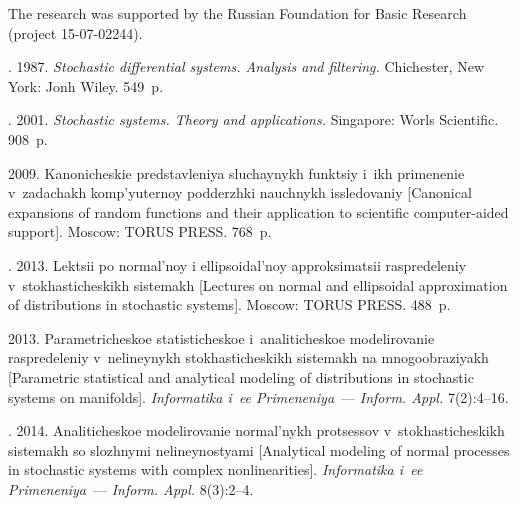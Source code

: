 
\vspace*{-9pt}

\Ack
\noindent
The research was supported by the Russian
Foundation for Basic Research (project 15-07-02244).





  \begin{multicols}{2}

\renewcommand{\bibname}{\protect\rmfamily References}



{\small\frenchspacing
 {%
 \begin{thebibliography}{99}


.  1987.
\textit{Stochastic differential systems. Analysis and filtering.}
Chichester, New York: Jonh Wiley. 549~p.

. 2001.
\textit{Stochastic systems. Theory and  applications.}
Singapore: Worls Scientific. 908~p.

 2009.
Kanonicheskie predstavleniya sluchaynykh funktsiy i~ikh primenenie
v~zadachakh kom\-p'yu\-ter\-noy podderzhki nauchnykh issledovaniy
[Canonical expansions of random functions and their application to scientific
computer-aided support]. Moscow: TORUS PRESS. 768~p.

.  2013.
Lektsii po normal'noy i ellipsoidal'noy approksimatsii raspredeleniy
v~stokhasticheskikh sistemakh [Lectures on normal and ellipsoidal
approximation of distributions in stochastic systems]. Moscow: TORUS PRESS. 488~p.

  2013.
Parametricheskoe statisticheskoe i~analiticheskoe modelirovanie raspredeleniy
v~nelineynykh stokhasticheskikh sistemakh na mnogo\-ob\-ra\-zi\-yakh
[Parametric statistical and analytical modeling of distributions in
stochastic systems on manifolds].
\textit{Informatika i~ee Primeneniya}~--- \textit{Inform. Appl.} 7(2):4--16.

. 2014.
 Analiticheskoe modelirovanie normal'nykh protsessov v~sto\-kha\-sti\-che\-skikh
 sistemakh so slozhnymi nelineynostyami [Analytical modeling of normal
  processes in stochastic systems with complex nonlinearities].
  \textit{Informatika i~ee Primeneniya}~--- \textit{Inform. Appl.}  8(3):2--4.


\end{thebibliography}}}
\end{multicols}
